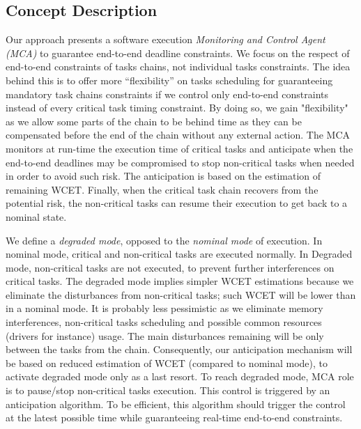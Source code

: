 \documentclass[french, a4paper, 11pt, twoside, pdftex]{StyleThese}
\begin{document}
    \subsection{Concept Description}
        Our approach presents a software execution \emph{Monitoring and Control Agent (MCA)} to guarantee end-to-end deadline constraints.
        We focus on the respect of end-to-end constraints of tasks chains, not individual tasks constraints. The idea behind this is to offer more ``flexibility'' on tasks scheduling for guaranteeing mandatory task chains constraints if we control only end-to-end constraints instead of every critical task timing constraint. By doing so, we gain "flexibility" as we allow some parts of the chain to be behind time as they can be compensated before the end of the chain without any external action. The MCA monitors at run-time the execution time of critical tasks and anticipate when the end-to-end deadlines may be compromised to stop non-critical tasks when needed in order to avoid such risk. The anticipation is based on the estimation of remaining WCET. Finally, when the critical task chain recovers from the potential risk, the non-critical tasks can resume their execution to get back to a nominal state.
        
        We define a \textit{degraded mode}, opposed to the \textit{nominal mode} of execution. In nominal mode, critical and non-critical tasks are executed normally. In Degraded mode, non-critical tasks are not executed, to prevent further interferences on critical tasks. The degraded mode implies simpler WCET estimations because we eliminate the disturbances from non-critical tasks; such WCET will be lower than in a nominal mode. It is probably less pessimistic as we eliminate memory interferences, non-critical tasks scheduling and possible common resources (drivers for instance) usage. The main disturbances remaining will be only between the tasks from the chain. Consequently, our anticipation mechanism will be based on reduced estimation of WCET (compared to nominal mode), to activate degraded mode only as a last resort.
        \smallbreak
        To reach degraded mode, MCA role is to pause/stop non-critical tasks execution. This control is triggered by an anticipation algorithm. To be efficient, this algorithm should trigger the control at the latest possible time while guaranteeing real-time end-to-end constraints.
        
\end{document}
